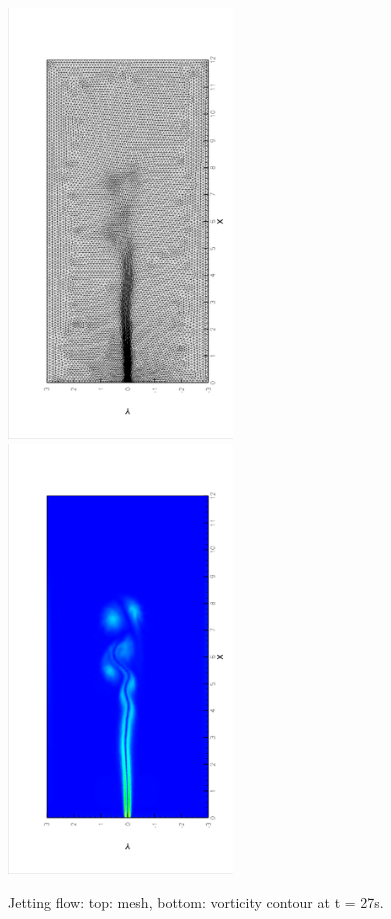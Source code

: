 \documentclass[a4paper, 11pt]{article}
\begin{document}
       \begin{figure}[!htbp]
         \begin{center}
             \includegraphics[width = 0.53\textwidth, angle = -90]{picture/jet_flow_data/mesh_t27s.eps}
             \includegraphics[width = 0.53\textwidth, angle = -90]{picture/jet_flow_data/contour_t27s.eps}
        \end{center}
        \caption{\small Jetting flow: top: mesh, bottom: vorticity contour at t = 27s.}
        \label{fig::jetting_flow_mesht27s}
       \end{figure}
       
\end{document}
